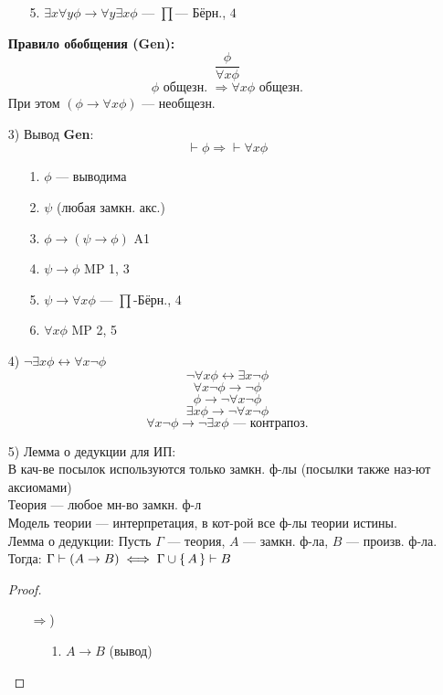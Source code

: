 \begin{itemize}
\begin{itemize}
     \item [5. ] $\exists x \forall y \phi \rightarrow \forall y \exists x \phi$ --- $\prod$--- Бёрн., $4$
   \end{itemize}
  \textbf{Правило обобщения (Gen):}
  \[
  \frac{\phi}{\forall x \phi}
  \]
  \[
  \phi \text{ общезн. } \Rightarrow \forall x \phi \text{ общезн.}
  \]
  При этом $(\phi \rightarrow \forall x \phi)$ --- необщезн.
\item [3) ] Вывод \textbf{Gen}:
  \[
    \vdash \phi \Rightarrow \vdash \forall x \phi
  \]
  \begin{itemize}
    \item [1. ] $\phi$ --- выводима \\
    \item [2. ] $\psi$ (любая замкн. акс.)
    \item [3. ] $\phi \rightarrow (\psi \rightarrow \phi)$ A1
    \item [4. ] $\psi \rightarrow \phi$ MP 1, 3
    \item [5. ] $\psi \rightarrow \forall x \phi$ --- $\prod$-Бёрн., 4
    \item [6. ] $\forall x \phi$ MP 2, 5
  \end{itemize}
\item [4) ] $\neg \exists x \phi \leftrightarrow \forall x \neg \phi$
  \[
  \neg \forall x \phi \leftrightarrow \exists x \neg \phi
  \]
  \[
  \forall x \neg \phi \rightarrow \neg \phi
  \]
  \[
  \phi \rightarrow \neg \forall x \neg \phi
  \]
  \[
  \exists x \phi \rightarrow \neg  \forall x \neg \phi
  \]
  \[
  \forall x \neg \phi \rightarrow \neg \exists x \phi \text{ --- контрапоз.}
  \]
\item [5) ] Лемма о дедукции для ИП: \\
  В кач-ве посылок используются только замкн. ф-лы (посылки также наз-ют аксиомами) \\
  Теория --- любое мн-во замкн. ф-л \\
  Модель теории --- интерпретация, в кот-рой все ф-лы теории истины. \\
  Лемма о дедукции: Пусть $\Gamma$ --- теория, $A$ --- замкн. ф-ла, $B$ --- произв. ф-ла. \\ Тогда: $\Gamma \vdash (A \rightarrow B) \iff \Gamma \cup \set{A} \vdash B$
  \begin{proof}
    \begin{itemize}
      \item [$\Rightarrow$)]
        \begin{itemize}
          \item [1. ] $A \rightarrow B$ (вывод)

\end{itemize}
\end{itemize}
\end{proof}
\end{itemize}
